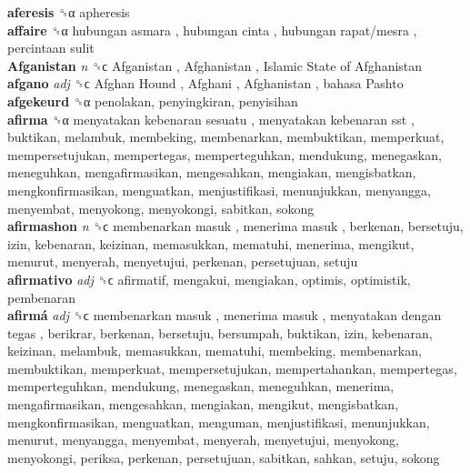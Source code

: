 \textbf{aferesis} ␝α  apheresis  \\
\textbf{affaire} ␝α   hubungan asmara ,  hubungan cinta ,  hubungan rapat/mesra ,  percintaan sulit   \\
\textbf{Afganistan} \emph{n}  ␝ϲ   Afganistan ,  Afghanistan ,  Islamic State of Afghanistan   \\
\textbf{afgano} \emph{adj}  ␝ϲ   Afghan Hound ,  Afghani ,  Afghanistan ,  bahasa Pashto   \\
\textbf{afgekeurd} ␝α  penolakan, penyingkiran, penyisihan  \\
\textbf{afirma} ␝α   menyatakan kebenaran sesuatu ,  menyatakan kebenaran sst , buktikan, melambuk, membeking, membenarkan, membuktikan, memperkuat, mempersetujukan, mempertegas, memperteguhkan, mendukung, menegaskan, meneguhkan, mengafirmasikan, mengesahkan, mengiakan, mengisbatkan, mengkonfirmasikan, menguatkan, menjustifikasi, menunjukkan, menyangga, menyembat, menyokong, menyokongi, sabitkan, sokong  \\
\textbf{afirmashon} \emph{n}  ␝ϲ   membenarkan masuk ,  menerima masuk , berkenan, bersetuju, izin, kebenaran, keizinan, memasukkan, mematuhi, menerima, mengikut, menurut, menyerah, menyetujui, perkenan, persetujuan, setuju  \\
\textbf{afirmativo} \emph{adj}  ␝ϲ  afirmatif, mengakui, mengiakan, optimis, optimistik, pembenaran  \\
\textbf{afirmá} \emph{adj}  ␝ϲ   membenarkan masuk ,  menerima masuk ,  menyatakan dengan tegas , berikrar, berkenan, bersetuju, bersumpah, buktikan, izin, kebenaran, keizinan, melambuk, memasukkan, mematuhi, membeking, membenarkan, membuktikan, memperkuat, mempersetujukan, mempertahankan, mempertegas, memperteguhkan, mendukung, menegaskan, meneguhkan, menerima, mengafirmasikan, mengesahkan, mengiakan, mengikut, mengisbatkan, mengkonfirmasikan, menguatkan, menguman, menjustifikasi, menunjukkan, menurut, menyangga, menyembat, menyerah, menyetujui, menyokong, menyokongi, periksa, perkenan, persetujuan, sabitkan, sahkan, setuju, sokong  \\
